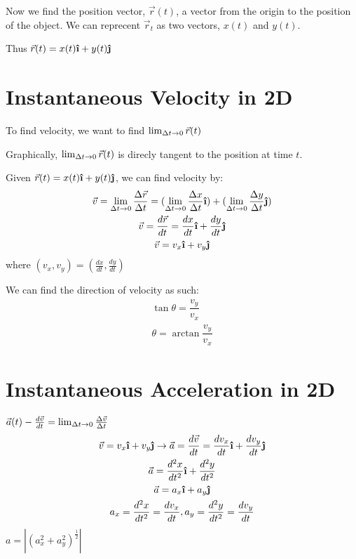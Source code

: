 \documentclass{report}
\begin{document}
Now we find the position vector, $\vec{r}(t)$, a vector from the origin to the position of the object. We can reprecent $\vec{r}_t$ as two vectors, $x(t)$ and $y(t)$. 

Thus $\vec{r}(t) = x(t)\ihat + y(t)\jhat$

\section{Instantaneous Velocity in 2D}

To find velocity, we want to find $\lim_{\Delta t \to 0} \vec{r}(t)$

Graphically, $\lim_{\Delta t \to 0} \vec{r}(t)$ is direcly tangent to the position at time $t$. 

Given $\vec{r}(t) = x(t)\ihat + y(t)\jhat$, we can find velocity by:
\begin{gather*}
  \vel = \lim_{\dlt t \to 0} \frac{\dlt \vec{r}}{\dlt t} = (\limto \frac{\dlt x}{\dlt t} \ihat) + (\limto \frac{\dlt y}{\dlt t} \jhat) \\
  \vel = \frac{d\vec{r}}{dt} = \frac{dx}{dt} \ihat + \frac{dy}{dt} \jhat \\
  \vel = v_x \ihat + v_y \jhat
\end{gather*}
where $(v_x, v_y) = (\frac{dx}{dt}, \frac{dy}{dt})$


We can find the direction of velocity as such:
\begin{gather*}
  \tan \theta = \dfrac{v_y}{v_x}\\
  \theta = \arctan{\dfrac{v_y}{v_x}}
\end{gather*}

\section{Instantaneous Acceleration in 2D}

$\vec{a} (t) - \frac{d\vec{v}}{dt} = \lim_{\Delta t \to 0} \frac{\Delta \vec{v}}{\Delta t}$
\begin{gather*}
  \vel = v_x \ihat + v_y \jhat \lthen \acc = \frac{d\vel}{dt} = \frac{dv_x}{dt} \ihat + \frac{dv_y}{dt} \jhat\\
  \acc = \frac{d^2x}{dt^2} \ihat + \frac{d^2y}{dt^2}\\
  \acc = a_x \ihat + a_y \jhat\\
  a_x = \frac{d^2x}{dt^2} = \frac{dv_x}{dt}, a_y = \frac{d^2y}{dt^2} = \frac{dv_y}{dt}
\end{gather*}
$a = |(a_x^2 + a_y^2)^\frac{1}{2}|$
\end{document}
